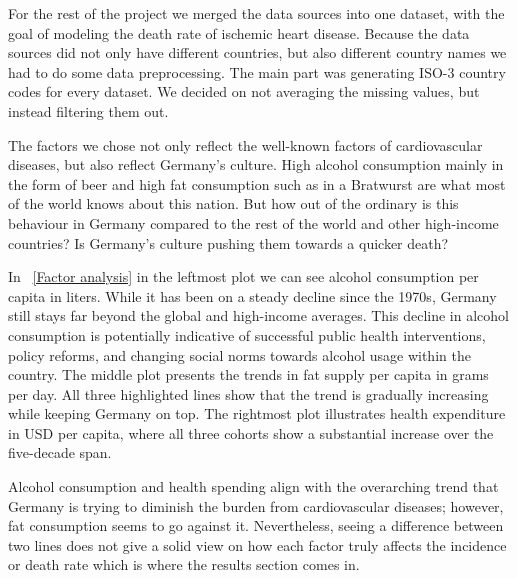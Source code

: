 For the rest of the project we merged the data sources into one dataset, with the goal of modeling the death rate of ischemic heart disease. Because the data sources did not only have different countries, but also different country names we had to do some data preprocessing. The main part was generating ISO-3 country codes for every dataset. 
We decided on not averaging the missing values, but instead filtering them out.

The factors we chose not only reflect the well-known factors of cardiovascular diseases, but also reflect Germany's culture. High alcohol consumption mainly in the form of beer and high fat consumption such as in a Bratwurst are what most of the world knows about this nation. But how out of the ordinary is this behaviour in Germany compared to the rest of the world and other high-income countries? Is Germany's culture pushing them towards a quicker death?

In \figurename~\ref{Factor analysis} in the leftmost plot we can see alcohol consumption per capita in liters. While it has been on a steady decline since the 1970s, Germany still stays far beyond the global and high-income averages. This decline in alcohol consumption is potentially indicative of successful public health interventions, policy reforms, and changing social norms towards alcohol usage within the country. The middle plot presents the trends in fat supply per capita in grams per day. All three highlighted lines show that the trend is gradually increasing while keeping Germany on top. The rightmost plot illustrates health expenditure in USD per capita, where all three cohorts show a substantial increase over the five-decade span.

Alcohol consumption and health spending align with the overarching trend that Germany is trying to diminish the burden from cardiovascular diseases; however, fat consumption seems to go against it. Nevertheless, seeing a difference between two lines does not give a solid view on how each factor truly affects the incidence or death rate which is where the results section comes in.